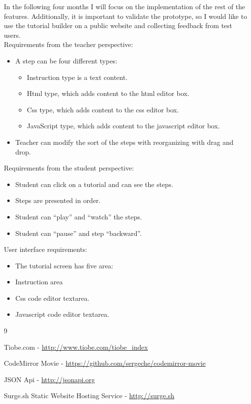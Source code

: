 In the following four months I will focus on the implementation of the
rest of the features. Additionally, it is important to validate the
prototype, so I would like to use the tutorial builder on a public
website and collecting feedback from test users.\\
Requirements from the teacher perspective:

\begin{itemize}
\item
  A step can be four different types:

  \begin{itemize}
  \item
    Instruction type is a text content.
  \item
    Html type, which adds content to the html editor box.
  \item
    Css type, which adds content to the css editor box.
  \item
    JavaScript type, which adds content to the javascript editor box.
  \end{itemize}
\item
  Teacher can modify the sort of the steps with reorganizing with drag
  and drop.
\end{itemize}

Requirements from the student perspective:

\begin{itemize}
\item
  Student can click on a tutorial and can see the steps.
\item
  Steps are presented in order.
\item
  Student can ``play'' and ``watch'' the steps.
\item
  Student can ``pause'' and step ``backward''.
\end{itemize}

User interface requirements:

\begin{itemize}
\item
  The tutorial screen has five area:
\item
  Instruction area
\item
  Css code editor textarea.
\item
  Javascript code editor textarea.
\end{itemize}

{9}

Tiobe.com - \url{http://www.tiobe.com/tiobe_index}

CodeMirror Movie - \url{https://github.com/sergeche/codemirror-movie}

JSON Api - \url{http://jsonapi.org}

Surge.sh Static Website Hosting Service - \url{http://surge.sh}
